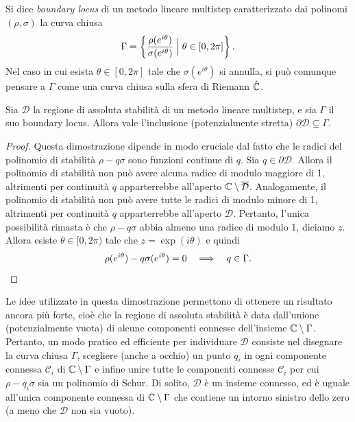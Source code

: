 \begin{defi}
Si dice \emph{boundary locus} di un metodo lineare multistep caratterizzato
dai polinomi $(\rho,\sigma)$ la curva chiusa
\[
\Gamma = \left\{ \frac{\rho(e^{i\theta})}{\sigma(e^{i\theta})}
\Bigm| \theta \in [0,2\pi] \right\}.
\]
Nel caso in cui esista $\theta \in [0,2\pi]$ tale che $\sigma(e^{i\theta})$
si annulla, si può comunque pensare a $\Gamma$ come una curva chiusa
sulla sfera di Riemann $\hat{\mathbb{C}}$.
\end{defi}

\begin{teor}
Sia $\mathcal{D}$ la regione di assoluta stabilità di un metodo lineare
multistep, e sia $\Gamma$ il suo boundary locus. Allora vale l'inclusione
(potenzialmente stretta) $\partial \mathcal{D} \subseteq \Gamma$.
\end{teor}

\begin{proof}
Questa dimostrazione dipende in modo cruciale dal fatto che le radici
del polinomio di stabilità $\rho - q \sigma$ sono funzioni continue di $q$.
Sia $q \in \partial \mathcal{D}$. Allora il polinomio di stabilità
non può avere alcuna radice di modulo maggiore di 1, altrimenti
per continuità $q$ apparterrebbe all'aperto
$\mathbb{C} \setminus \overline{\mathcal{D}}$.
Analogamente, il polinomio di stabilità non può avere tutte le radici
di modulo minore di 1, altrimenti per continuità $q$ apparterrebbe
all'aperto $\mathcal{D}$. Pertanto, l'unica possibilità rimasta è che
$\rho - q \sigma$ abbia almeno una radice di modulo 1, diciamo $z$.
Allora esiste $\theta \in [0,2\pi)$ tale che $z = \exp(i\theta)$
e quindi
\[
\rho(e^{i\theta}) - q \sigma(e^{i\theta}) = 0
\quad \Longrightarrow \quad q \in \Gamma. \qedhere
\]
\end{proof}

\noindent Le idee utilizzate in questa dimostrazione permettono di ottenere
un risultato ancora più forte, cioè che la regione di assoluta stabilità è data
dall'unione (potenzialmente vuota) di alcune componenti connesse dell'insieme
$\mathbb{C} \setminus \Gamma$. Pertanto, un modo pratico ed efficiente per individuare
$\mathcal{D}$ consiste nel disegnare la curva chiusa $\Gamma$,
scegliere (anche a occhio) un punto $q_i$ in ogni componente connessa
$\mathcal{C}_i$ di $\mathbb{C} \setminus \Gamma$ e infine unire tutte le componenti
connesse $\mathcal{C}_i$ per cui $\rho - q_i \sigma$ sia un polinomio di Schur.
Di solito, $\mathcal{D}$ è un insieme connesso, ed è uguale all'unica
componente connessa di $\mathbb{C} \setminus \Gamma$ che contiene un intorno
sinistro dello zero (a meno che $\mathcal{D}$ non sia vuoto).

